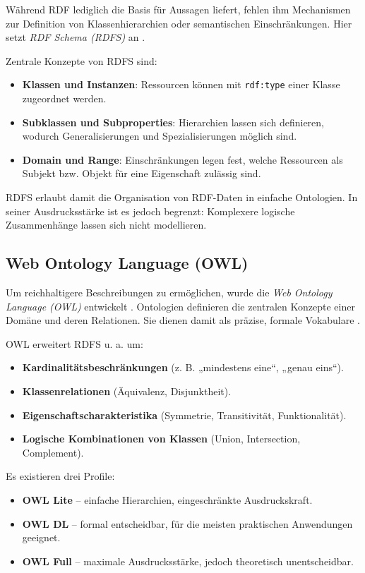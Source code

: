 Während RDF lediglich die Basis für Aussagen liefert, fehlen ihm Mechanismen zur Definition von Klassenhierarchien oder semantischen Einschränkungen. Hier setzt \textit{RDF Schema (RDFS)} an \cite{w3c_rdfs}.  

Zentrale Konzepte von RDFS sind:  
\begin{itemize}
    \item \textbf{Klassen und Instanzen}: Ressourcen können mit \texttt{rdf:type} einer Klasse zugeordnet werden.  
    \item \textbf{Subklassen und Subproperties}: Hierarchien lassen sich definieren, wodurch Generalisierungen und Spezialisierungen möglich sind.  
    \item \textbf{Domain und Range}: Einschränkungen legen fest, welche Ressourcen als Subjekt bzw. Objekt für eine Eigenschaft zulässig sind.  
\end{itemize}

RDFS erlaubt damit die Organisation von RDF-Daten in einfache Ontologien. In seiner Ausdrucksstärke ist es jedoch begrenzt: Komplexere logische Zusammenhänge lassen sich nicht modellieren.  

\subsection{Web Ontology Language (OWL)}

Um reichhaltigere Beschreibungen zu ermöglichen, wurde die \textit{Web Ontology Language (OWL)} entwickelt \cite{w3c_owl}. Ontologien definieren die zentralen Konzepte einer Domäne und deren Relationen. Sie dienen damit als präzise, formale Vokabulare \cite{antoniou2008primer}.  

OWL erweitert RDFS u. a. um:  
\begin{itemize}
    \item \textbf{Kardinalitätsbeschränkungen} (z. B. „mindestens eine“, „genau eins“).  
    \item \textbf{Klassenrelationen} (Äquivalenz, Disjunktheit).  
    \item \textbf{Eigenschaftscharakteristika} (Symmetrie, Transitivität, Funktionalität).  
    \item \textbf{Logische Kombinationen von Klassen} (Union, Intersection, Complement).  
\end{itemize}

Es existieren drei Profile:  
\begin{itemize}
    \item \textbf{OWL Lite} – einfache Hierarchien, eingeschränkte Ausdruckskraft.  
    \item \textbf{OWL DL} – formal entscheidbar, für die meisten praktischen Anwendungen geeignet.  
    \item \textbf{OWL Full} – maximale Ausdrucksstärke, jedoch theoretisch unentscheidbar.  
\end{itemize}

